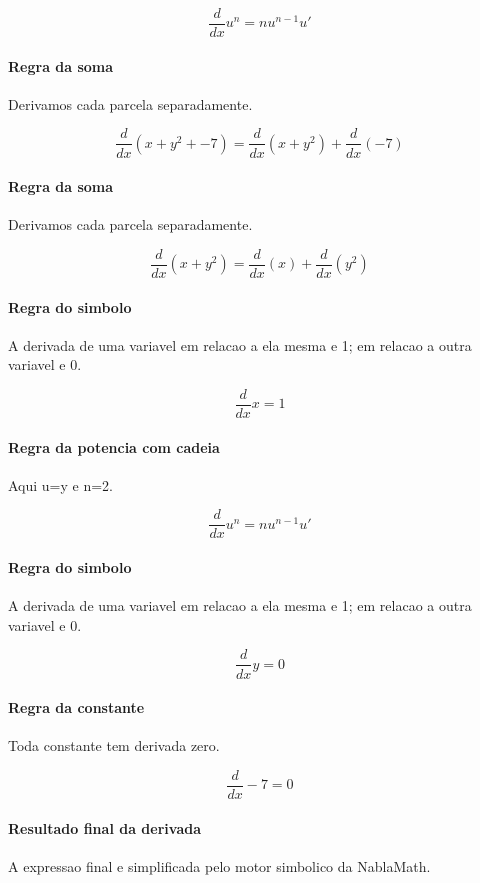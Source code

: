 \documentclass[11pt,a4paper]{article}
\begin{document}
\[
\frac{d}{dx}u^n=n u^{n-1}u'
\]

\paragraph{Regra da soma} Derivamos cada parcela separadamente.

\[
\frac{d}{dx}\left(x + y^{2} + -7\right)=\frac{d}{dx}\left(x + y^{2}\right)+\frac{d}{dx}\left(-7\right)
\]

\paragraph{Regra da soma} Derivamos cada parcela separadamente.

\[
\frac{d}{dx}\left(x + y^{2}\right)=\frac{d}{dx}\left(x\right)+\frac{d}{dx}\left(y^{2}\right)
\]

\paragraph{Regra do simbolo} A derivada de uma variavel em relacao a ela mesma e 1; em relacao a outra variavel e 0.

\[
\frac{d}{dx}x=1
\]

\paragraph{Regra da potencia com cadeia} Aqui u=y e n=2.

\[
\frac{d}{dx}u^n=n u^{n-1}u'
\]

\paragraph{Regra do simbolo} A derivada de uma variavel em relacao a ela mesma e 1; em relacao a outra variavel e 0.

\[
\frac{d}{dx}y=0
\]

\paragraph{Regra da constante} Toda constante tem derivada zero.

\[
\frac{d}{dx}-7=0
\]

\paragraph{Resultado final da derivada} A expressao final e simplificada pelo motor simbolico da NablaMath.
\end{document}
